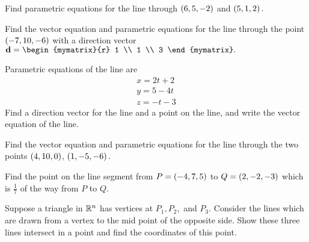 \begin{enumialphparenastyle}
\begin{ex} Find parametric equations for the line through $\left(6 , 5 , -2 \right) $ 
and $\left(5 , 1 , 2 \right) .$ 
\end{ex} 
 

\begin{ex} Find the vector equation and parametric equations for the line through the point $\left(
-7, 10 , -6 \right) $ with a direction vector $\vect{d} = \begin{mymatrix}{r}
1 \\
1 \\
3
\end{mymatrix} .$ \vspace{1mm}
\end{ex} 

\begin{ex} Parametric equations of the line are 
\begin{equation*}
\begin{array}{c}
x = 2t+2\\
y = 5-4t\\
z= -t-3
\end{array}
\end{equation*}
 Find a direction vector for the line and a point on the line, and write the 
vector equation of the line. 
\end{ex} 


\begin{ex} Find the vector equation and parametric equations for the line through the two points $\left(
4, 10, 0 \right) $, $\left(1 , -5 , -6 \right) .$ 
\end{ex} 

\begin{ex} Find the point on the line segment from $P = \left(-4, 7, 5 \right) $
 to $Q = \left(2 , -2 , -3 \right) $ which is $\frac{1}{7}$ of the way from $P$ to $Q$.
\end{ex} 

\begin{ex} Suppose a triangle in $\mathbb{R}^{n}$  has vertices at $P_{1}, P_{2},$ and $P_{3}$. 
Consider the lines which are
drawn from a vertex to the mid point of the opposite side. Show these three
lines intersect in a point and find the coordinates of this point. 
\end{ex} 

\end{enumialphparenastyle}